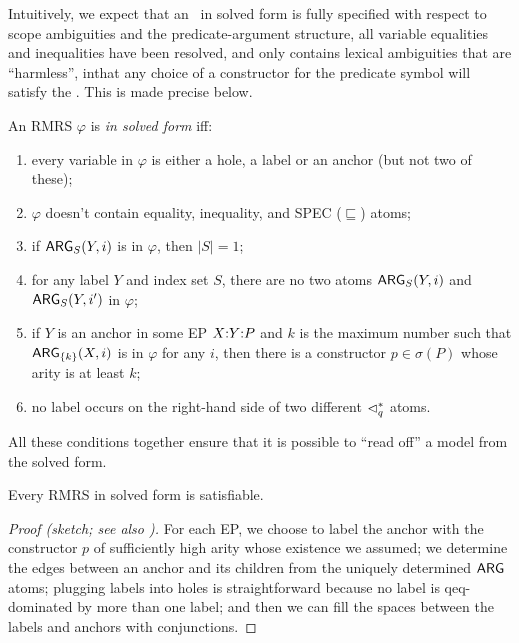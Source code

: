 Intuitively, we expect that an \rmrs\ in solved form is fully
specified with respect to scope ambiguities and the predicate-argument
structure, all variable equalities and inequalities have been
resolved, and only contains lexical ambiguities that are ``harmless'',
inthat any choice of a constructor for the predicate symbol will
satisfy the \rmrs.  This is made precise below.


\begin{definition}\label{defn:solved-forms}
  An RMRS $\varphi$ is \emph{in solved form} iff:
  \begin{enumerate}
  \item every variable in $\varphi$ is either a hole, a label or an
    anchor (but not two of these);
  \item $\varphi$ doesn't contain equality, inequality, and SPEC
    ($\sqsubseteq$) atoms;
  \item if $\mathsf{ARG}_S(Y,i)$ is in $\varphi$, then $|S| = 1$;
  \item for any label $Y$ and index set $S$, there
    are no two atoms $\mathsf{ARG}_S(Y,i)$ and $\mathsf{ARG}_S(Y,i')$ in $\varphi$;
  \item if $Y$ is an anchor in some EP $X {:} Y {:} P$ and $k$ is the
    maximum number such that $\mathsf{ARG}_{\{k\}}(X,i)$ is in $\varphi$ for
    any $i$, then there is a constructor $p \in \sigma(P)$ whose arity
    is at least $k$;
  \item no label occurs on the right-hand side of two
    different $\lhd^*_q$ atoms.
  \end{enumerate}
\end{definition}


All these conditions together ensure that it is possible to ``read
off'' a model from the solved form.


\begin{prop}
  Every RMRS in solved form is satisfiable.
\end{prop}
\begin{proof}[Proof (sketch; see also
  \cite{Duchier00dominanceconstraints})] 
  For each EP, we choose to label the anchor with the constructor $p$
  of sufficiently high arity whose existence we assumed; we determine
  the edges between an anchor and its children from the uniquely
  determined $\mathsf{ARG}$ atoms; plugging labels into holes is
  straightforward because no label is qeq-dominated by more than one
  label; and then we can fill the spaces between the labels and
  anchors with conjunctions.
\end{proof}



